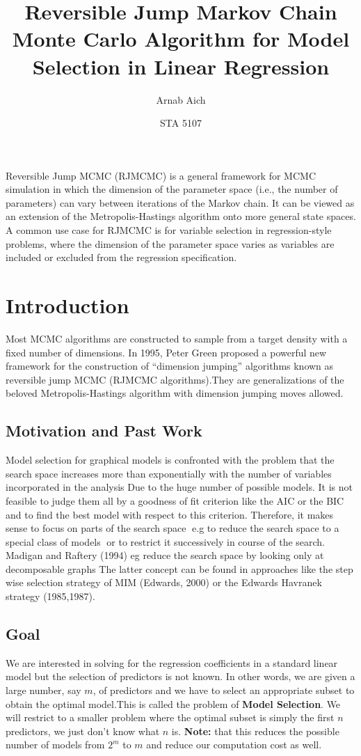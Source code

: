 \documentclass[12pt,a4paper]{article}
\title{\large \textbf{Reversible Jump Markov Chain Monte Carlo Algorithm for Model Selection in Linear Regression}}
\author{\large Arnab Aich}
\date{\large STA 5107}
\begin{document}
Reversible Jump MCMC (RJMCMC) is a general framework for MCMC simulation in which the dimension of the parameter space (i.e., the number of parameters) can vary between iterations of the Markov chain. It can be viewed as an extension of the Metropolis-Hastings algorithm onto more general state spaces. A common use case for RJMCMC is for variable selection in regression-style problems, where the dimension of the parameter space varies as variables are included or excluded from the regression specification.
\section{Introduction}
Most MCMC algorithms are constructed to sample from a target density with a fixed number of dimensions. In 1995, Peter Green  proposed a powerful new framework for the construction of “dimension jumping” algorithms known as reversible jump MCMC (RJMCMC algorithms).They are generalizations of the beloved Metropolis-Hastings algorithm  with dimension jumping moves allowed.
\subsection{Motivation and Past Work}
Model selection for graphical models is confronted with the problem that the search space increases more than exponentially with the number of variables incorporated in the analysis Due to the huge number of possible models. It is not feasible to judge them all by a goodness of fit criterion like the AIC or the BIC and to find the best model with respect to this criterion. Therefore, it makes sense to focus on parts of the search space e.g to reduce the search space to a special class of models or to restrict it successively in course of the search.
Madigan and Raftery (1994) eg reduce the search space by looking only at decomposable graphs The latter concept can be found in approaches like the step wise selection strategy of MIM (Edwards, 2000) or the Edwards Havranek strategy (1985,1987).
\subsection{Goal}
We are interested in solving for the regression coefficients in a standard linear model but the selection of predictors is not known. In other words, we are given a large number, say $m$, of predictors and we have to select an appropriate subset to obtain the optimal model.This is called the problem of \textbf{Model Selection}. We will restrict to a smaller problem where the optimal subset is simply the first $n$ predictors, we just don't know what $n$ is. 
\newline \textbf{Note:} that this reduces the possible number of models from $2^m$ to $m$ and reduce our computation cost as well.
\end{document}
